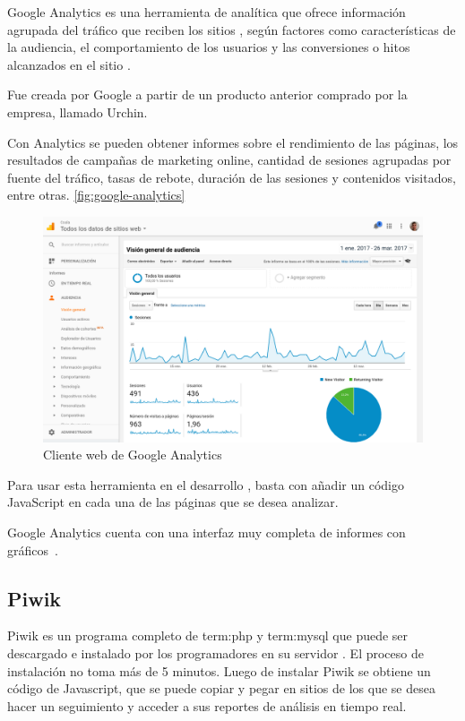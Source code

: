Google Analytics es una herramienta de analítica  que ofrece información
agrupada del tráfico que reciben los sitios , según factores como
características de la audiencia, el comportamiento de los usuarios y las
conversiones o hitos alcanzados en el sitio .

Fue creada por Google a partir de un producto anterior comprado por la empresa,
llamado Urchin.

Con Analytics se pueden obtener informes sobre el rendimiento de las páginas,
los resultados de campañas de marketing online, cantidad de sesiones agrupadas
por fuente del tráfico, tasas de rebote, duración de las sesiones y contenidos
visitados, entre otras. \autoref{fig:google-analytics}


\begin{figure}
  \includegraphics[width=\linewidth]{src/images/anexos/google-analytics.png}
  \caption{Cliente web de Google Analytics}
  \label{fig:google-analytics}
\end{figure}

Para usar esta herramienta en el desarrollo , basta con añadir un código
JavaScript en cada una de las páginas  que se desea analizar.

Google Analytics cuenta con una interfaz muy completa de informes con
gráficos~\cite{analytics}.

\subsection{Piwik}

Piwik es un programa completo de \gls{term:php} y \gls{term:mysql} que puede ser descargado e
instalado por los programadores en su servidor . El proceso de instalación
no toma más de 5 minutos. Luego de instalar Piwik se obtiene un código de
Javascript, que se puede copiar y pegar en sitios  de los que se desea hacer
un seguimiento y acceder a sus reportes de análisis en tiempo real.

